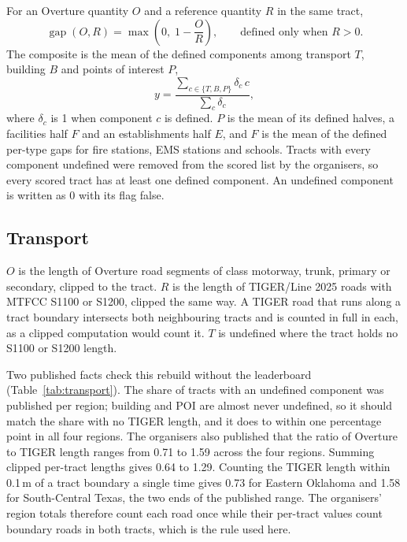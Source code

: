 \documentclass[11pt]{article}
\newcommand{\gap}{\operatorname{gap}}
\begin{document}
For an Overture quantity $O$ and a reference quantity $R$ in the same tract,
\begin{equation}
\gap(O, R) = \max\!\left(0,\; 1 - \frac{O}{R}\right), \qquad
\text{defined only when } R > 0.
\label{eq:gap}
\end{equation}
The composite is the mean of the defined components among transport $T$,
building $B$ and points of interest $P$,
\begin{equation}
y = \frac{\sum_{c \in \{T, B, P\}} \delta_c\, c}{\sum_{c} \delta_c},
\label{eq:composite}
\end{equation}
where $\delta_c$ is 1 when component $c$ is defined. $P$ is the mean of its
defined halves, a facilities half $F$ and an establishments half $E$, and $F$
is the mean of the defined per-type gaps for fire stations, EMS stations and
schools. Tracts with every component undefined were removed from the scored
list by the organisers, so every scored tract has at least one defined
component. An undefined component is written as 0 with its flag false.

\subsection{Transport}

$O$ is the length of Overture road segments of class motorway, trunk, primary
or secondary, clipped to the tract. $R$ is the length of TIGER/Line 2025
roads with MTFCC S1100 or S1200, clipped the same way. A TIGER road that runs
along a tract boundary intersects both neighbouring tracts and is counted in
full in each, as a clipped computation would count it. $T$ is undefined where
the tract holds no S1100 or S1200 length.

Two published facts check this rebuild without the leaderboard
(Table~\ref{tab:transport}). The share of tracts with an undefined component
was published per region; building and POI are almost never undefined, so it
should match the share with no TIGER length, and it does to within one
percentage point in all four regions. The organisers also published that the
ratio of Overture to TIGER length ranges from 0.71 to 1.59 across the four
regions. Summing clipped per-tract lengths gives 0.64 to 1.29. Counting the
TIGER length within 0.1\,m of a tract boundary a single time gives
0.73 for Eastern Oklahoma and 1.58 for South-Central Texas, the two ends of
the published range. The organisers' region totals therefore count each road
once while their per-tract values count boundary roads in both tracts, which
is the rule used here.
\end{document}

